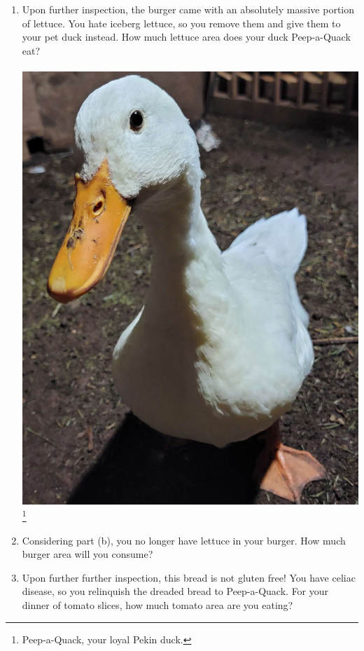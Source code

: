 \documentclass[letterpaper,11pt]{article}
\begin{document}
\begin{enumerate}
\begin{enumerate}
        \vfill
        \newpage
        \item Upon further inspection, the burger came with an absolutely massive portion of lettuce. You hate iceberg lettuce, so you remove them and give them to your pet duck instead. How much lettuce area does your duck Peep-a-Quack eat?\\\\
        \includegraphics[width=0.15\linewidth]{New/20221011_213701.jpg}\footnote{Peep-a-Quack, your loyal Pekin duck.}
        \vfill
        \item Considering part (b), you no longer have lettuce in your burger. How much burger area will you consume?
        \vfill
        \item Upon further further inspection, this bread is not gluten free! You have celiac disease, so you relinquish the dreaded bread to Peep-a-Quack. For your dinner of tomato slices, how much tomato area are you eating?
        \vfill
        \vfill
    \end{enumerate}
\end{enumerate}
\end{document}
